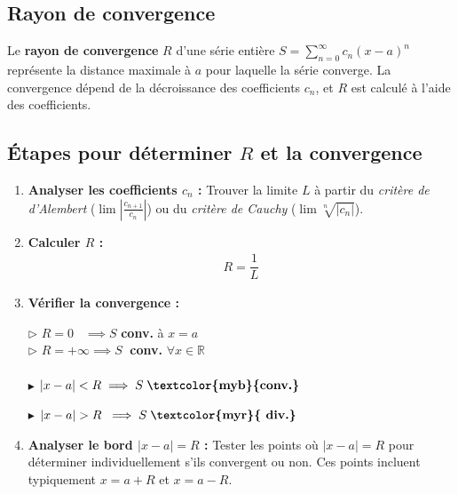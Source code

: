 \documentclass{report}
\begin{document}
\begin{multicols*}{3}
    \section{Rayon de convergence}


    Le \textbf{rayon de convergence} \(R\) d'une série entière 
    \(S = \sum_{n=0}^\infty c_n (x-a)^n\) représente la distance maximale à 
    \(a\) pour laquelle la série converge. La convergence dépend de la 
    décroissance des coefficients \(c_n\), et \(R\) est calculé à l'aide des 
    coefficients.

    \subsection{Étapes pour déterminer \(R\) et la convergence}

    \begin{enumerate}
        \item \textbf{Analyser les coefficients \(c_n\) :} Trouver la limite \(L\) 
        à partir du \textit{critère de d'Alembert} (\(\lim \left| \frac{c_{n+1}}{c_n} 
        \right|\)) ou du \textit{critère de Cauchy} (\(\lim \sqrt[n]{|c_n|}\)).
        
        \item \textbf{Calculer \(R\) :} 
            \begin{align*}
                \boxed{R = \dfrac{1}{L}}
            \end{align*}
        \item \textbf{Vérifier la convergence :}


            \noindent$\rhd$
                $R = 0 \;\;\; \implies S$ \; 
                \textcolor{myb}{\textbf{conv.}}  à $x = a$ 
            \\
            $\rhd$  $R = +\infty \implies S \;$ 
            \textcolor{myb}{\textbf{conv.}} 
            $\forall x \in \mathbb{R}$  
            \\ \\
            $\blacktriangleright$ 
            $|x - a| < R \implies  S \; \textbf{\textcolor{myb}{conv.}}$

            \noindent 
            $\blacktriangleright$ $|x - a| > R \; \implies  S \;
            \textbf{\textcolor{myr}{ div.}}$ 
        
\item \textbf{Analyser le bord \( |x - a| = R \) :} Tester les points où 
\( |x - a| = R \) pour déterminer individuellement s'ils convergent ou non. 
Ces points incluent typiquement \(x = a + R\) et \(x = a - R\).
    \end{enumerate}



\end{multicols*}
\end{document}
